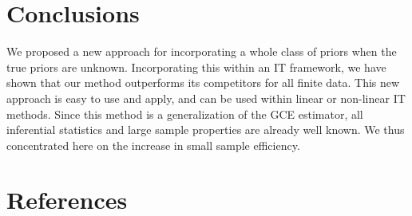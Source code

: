 \documentclass{elsarticle}
\begin{document}


\section{Conclusions}
\label{sec: conc}

We proposed a new approach for incorporating a whole class of priors when the true 
priors are unknown. 
Incorporating this within an IT framework, we have shown that our method outperforms 
its competitors for all finite data. 
This new approach is easy to use and apply, and can be used within linear or 
non-linear IT methods. 
Since this method is a generalization of the GCE estimator, all inferential statistics and 
large sample properties are already well known. 
We thus concentrated here on the increase in small sample efficiency.


\newpage
\cleardoublepage
\singlespacing

\section*{References}

\end{document}
